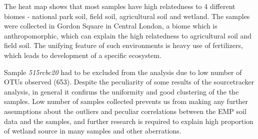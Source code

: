\documentclass[12pt,twocolumn]{article} %
\begin{document}
\par
The heat map shows that most samples have high relatedness to 4 different biomes - national park soil, field soil, agricultural soil and wetland. The samples were collected in Gordon Square in Central London, a biome which is anthropomorphic, which can explain the high relatedness to agricultural soil and field soil. The unifying feature of such environments is heavy use of fertilizers, which leads to development of a specific ecosystem\cite{Zhalnina2014}.
\par
Sample \textit{515rcbc20} had to be excluded from the analysis due to low number of OTUs observed (653). Despite the peculiarity of some results of the sourcetracker analysis, in general it confirms the uniformity and good clustering of the the samples. Low number of samples collected prevents us from making any further assumptions about the outliers and peculiar correlations between the EMP soil data and the samples, and further research is required to explain high proportion of wetland source in many samples and other aberrations.
\par

%
%
\end{document}
